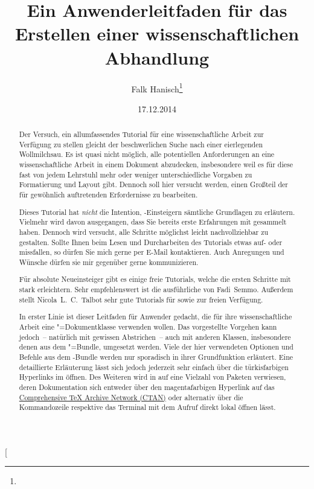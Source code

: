 \documentclass[%
  english,ngerman,%
  geometry=no,DIV=12,automark,%
]{tudscrartcl}
\begin{document}
\date{17.12.2014}
\author{Falk Hanisch\thanks{\noexpand\scriptsize\noexpand\Email{\tudscrmail}}}
\title{%
  Ein Anwenderleitfaden für das Erstellen einer wissenschaftlichen Abhandlung%
}
\makeatletter
\begingroup%
  \def\and{, }%
  \let\thanks\@gobble%
  \let\footnote\@gobble%
\endgroup%
\makeatother
\StartTutorial[%
  \begin{abstract}\noindent
  Der Versuch, ein allumfassendes Tutorial für eine wissenschaftliche Arbeit 
  zur Verfügung zu stellen gleicht der beschwerlichen Suche nach einer 
  eierlegenden Wollmilchsau. Es ist quasi nicht möglich, alle potentiellen 
  Anforderungen an eine wissenschaftliche Arbeit in einem Dokument abzudecken, 
  insbesondere weil es für diese fast von jedem Lehrstuhl mehr oder weniger 
  unterschiedliche Vorgaben zu Formatierung und Layout gibt. Dennoch soll hier 
  versucht werden, einen Großteil der für gewöhnlich auftretenden Erfordernisse 
  zu bearbeiten.
  
  Dieses Tutorial hat \emph{nicht} die Intention, -Einsteigern 
  sämtliche Grundlagen zu erläutern. Vielmehr wird davon ausgegangen, dass Sie 
  bereits erste Erfahrungen mit  gesammelt haben. Dennoch wird 
  versucht, alle Schritte möglichst leicht nachvollziehbar zu gestalten. Sollte 
  Ihnen beim Lesen und Durcharbeiten des Tutorials etwas auf- oder missfallen, 
  so dürfen Sie mich gerne per E-Mail kontaktieren. Auch Anregungen und Wünsche 
  dürfen sie mir gegenüber gerne kommunizieren.
  
  Für absolute Neueinsteiger gibt es einige freie Tutorials, welche die ersten 
  Schritte mit  stark erleichtern. Sehr empfehlenswert ist die 
  ausführliche  
  von Fadi~Semmo. Außerdem stellt Nicola~L.~C.~Talbot sehr gute Tutorials für 
  \cite{talbot2012} sowie 
  \cite{talbot2013} zur freien Verfügung.
  
  In erster Linie ist dieser Leitfaden für Anwender gedacht, die für ihre
  wissenschaftliche Arbeit eine \TUDScript"=Dokumentklasse verwenden wollen. 
  Das vorgestellte Vorgehen kann jedoch~-- natürlich mit gewissen Abstrichen~-- 
  auch mit anderen Klassen, insbesondere denen aus dem \KOMAScript"=Bundle, 
  umgesetzt werden. Viele der hier verwendeten Optionen und Befehle aus dem 
  \TUDScript-Bundle werden nur sporadisch in ihrer Grundfunktion erläutert. 
  Eine detaillierte Erläuterung lässt sich jedoch jederzeit sehr einfach über 
  die türkisfarbigen Hyperlinks im  
  öffnen. Des Weiteren wird in auf eine Vielzahl von Paketen verwiesen, deren 
  Dokumentation sich entweder über den magentafarbigen Hyperlink auf das 
  \href{http://www.ctan.org/}{Comprehensive TeX Archive Network (CTAN)} oder 
  alternativ über die Kommandozeile respektive das Terminal mit dem Aufruf 
   direkt lokal öffnen lässt.
  

\end{abstract}
\end{document}
